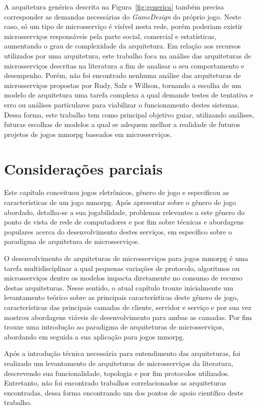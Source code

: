 A arquitetura genérica descrita na Figura~\ref{fig:generica} também precisa corresponder as demandas necessárias do \textit{GameDesign} do próprio jogo.
%
Neste caso, só um tipo de microsserviço é visível nesta rede, porém poderiam existir microsserviços responsáveis pela parte social, comercial e estatísticas, aumentando o grau de complexidade da arquitetura.
%
Em relação aos recursos utilizados por uma arquitetura, este trabalho foca na análise das arquiteturas de microsserviços descritas na literatura a fim de analisar o seu comportamento e desempenho.
%
Porém, não foi encontrado nenhuma análise das arquiteturas de microsserviços propostas por Rudy, Salz e Willson, tornando a escolha de um modelo de arquitetura uma tarefa complexa a qual demande testes de tentativa e erro ou análises particulares para viabilizar o funcionamento destes sistemas.
%
Dessa forma, este trabalho tem como principal objetivo guiar, utilizando análises, futuras escolhas de modelos a qual se adequem melhor a realidade de futuros projetos de jogos \ac{mmorpg} baseados em microsserviços.

\section{Considerações parciais}


Este capítulo conceituou jogos eletrônicos, gênero de jogo e especificou as características de um jogo \ac{mmorpg}.
%
Após apresentar sobre o gênero de jogo abordado, detalha-se a sua jogabilidade, problemas relevantes a este gênero do ponto de vista de rede de computadores e por fim sobre técnicas e abordagens populares acerca do desenvolvimento destes serviços, em específico sobre o paradigma de arquitetura de microsserviços.

O desenvolvimento de arquiteturas de microsserviços para jogos \ac{mmorpg} é uma tarefa multidisciplinar a qual pequenas variações de protocolo, algoritmos ou microsserviços dentre os modelos impacta diretamente no consumo de recurso destas arquiteturas.
%
Nesse sentido, o atual capítulo trouxe inicialmente um levantamento teórico sobre as principais características deste gênero de jogo, características das principais camadas de cliente, servidor e serviço e por sua vez mostrou abordagens viáveis de desenvolvimento para ambas as camadas.
%
Por fim trouxe uma introdução ao paradigma de arquiteturas de microsserviços, abordando em seguida a sua aplicação para jogos \ac{mmorpg}.

Após a introdução técnica necessária para entendimento das arquiteturas, foi realizado um levantamento de arquiteturas de microsserviços da literatura, descrevendo sua funcionalidade, topologia e por fim protocolos utilizados.
%
Entretanto, não foi encontrado trabalhos correlacionados as arquiteturas encontradas, dessa forma encontrando um dos pontos de apoio científico deste trabalho.

